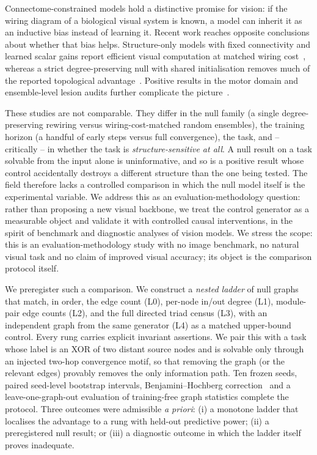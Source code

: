 \documentclass[10pt,twocolumn,letterpaper]{article}
\begin{document}
Connectome-constrained models hold a distinctive promise for vision: if the
wiring diagram of a biological visual system is known, a model can inherit it
as an inductive bias instead of learning it. Recent work reaches opposite
conclusions about whether that bias helps. Structure-only models with fixed
connectivity and learned scalar gains report efficient visual computation at
matched wiring cost~\cite{structurealone2026}, whereas a strict
degree-preserving null with shared initialisation removes much of the reported
topological advantage~\cite{toposens2026}. Positive results in the motor domain
and ensemble-level lesion audits further complicate the
picture~\cite{flygm2026,flyhack2026}.

These studies are not comparable. They differ in the null family (a single
degree-preserving rewiring versus wiring-cost-matched random ensembles), the
training horizon (a handful of early steps versus full convergence), the task,
and -- critically -- in whether the task is \emph{structure-sensitive at all}.
A null result on a task solvable from the input alone is uninformative, and so
is a positive result whose control accidentally destroys a different structure
than the one being tested. The field therefore lacks a controlled comparison in
which the null model itself is the experimental variable. We address this as
an evaluation-methodology question: rather than proposing a new visual
backbone, we treat the control generator as a measurable object and validate
it with controlled causal interventions, in the spirit of benchmark and
diagnostic analyses of vision models. We stress the scope: this is an
evaluation-methodology study with no image benchmark, no natural visual task
and no claim of improved visual accuracy; its object is the comparison
protocol itself.

We preregister such a comparison. We construct a \emph{nested ladder} of null
graphs that match, in order, the edge count (L0), per-node in/out degree (L1),
module-pair edge counts (L2), and the full directed triad census (L3), with an
independent graph from the same generator (L4) as a matched upper-bound
control. Every rung carries explicit invariant assertions. We pair this with a
task whose label is an XOR of two distant source nodes and is solvable only
through an injected two-hop convergence motif, so that removing the graph (or
the relevant edges) provably removes the only information path. Ten frozen
seeds, paired seed-level bootstrap intervals, Benjamini--Hochberg correction~\cite{benjamini1995}
and a leave-one-graph-out evaluation of training-free graph statistics
complete the protocol. Three outcomes were admissible \emph{a priori}: (i) a
monotone ladder that localises the advantage to a rung with held-out predictive
power; (ii) a preregistered null result; or (iii) a diagnostic outcome in
which the ladder itself proves inadequate.
\end{document}
